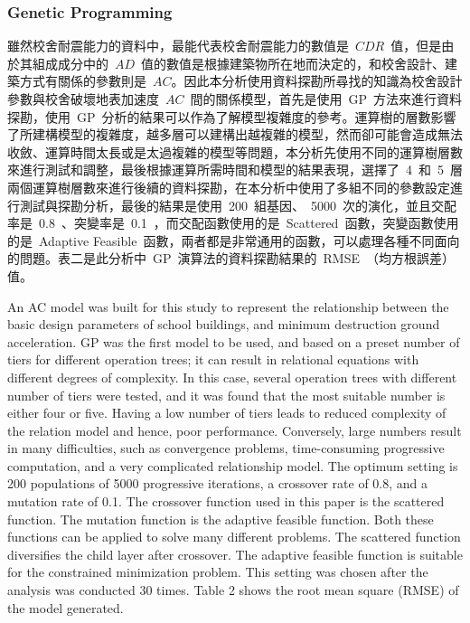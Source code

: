 \subsubsection{Genetic Programming}

雖然校舍耐震能力的資料中，最能代表校舍耐震能力的數值是~$CDR$~值，但是由於其組成成分中的~$AD$~值的數值是根據建築物所在地而決定的，和校舍設計、建築方式有關係的參數則是~$AC$。因此本分析使用資料探勘所尋找的知識為校舍設計參數與校舍破壞地表加速度~$AC$~間的關係模型，首先是使用~GP~方法來進行資料探勘，使用~GP~分析的結果可以作為了解模型複雜度的參考。運算樹的層數影響了所建構模型的複雜度，越多層可以建構出越複雜的模型，然而卻可能會造成無法收斂、運算時間太長或是太過複雜的模型等問題，本分析先使用不同的運算樹層數來進行測試和調整，最後根據運算所需時間和模型的結果表現，選擇了~4~和~5~層兩個運算樹層數來進行後續的資料探勘，在本分析中使用了多組不同的參數設定進行測試與探勘分析，最後的結果是使用~200~組基因、~5000~次的演化，並且交配率是~0.8~、突變率是~0.1~，而交配函數使用的是~Scattered~函數，突變函數使用的是~Adaptive Feasible~函數，兩者都是非常通用的函數，可以處理各種不同面向的問題。表二是此分析中~GP~演算法的資料探勘結果的~RMSE~（均方根誤差）值。

An AC model was built for this study to represent the relationship between the basic design parameters of school buildings, and minimum destruction ground acceleration. GP was the first model to be used, and based on a preset number of tiers for different operation trees; it can result in relational equations with different degrees of complexity. In this case, several operation trees with different number of tiers were tested, and it was found that the most suitable number is either four or five. Having a low number of tiers leads to reduced complexity of the relation model and hence, poor performance. Conversely, large numbers result in many difficulties, such as convergence problems, time-consuming progressive computation, and a very complicated relationship model. The optimum setting is 200 populations of 5000 progressive iterations, a crossover rate of 0.8, and a mutation rate of 0.1. The crossover function used in this paper is the scattered function. The mutation function is the adaptive feasible function. Both these functions can be applied to solve many different problems. The scattered function diversifies the child layer after crossover. The adaptive feasible function is suitable for the constrained minimization problem. This setting was chosen after the analysis was conducted 30 times. Table 2 shows the root mean square (RMSE) of the model generated.

